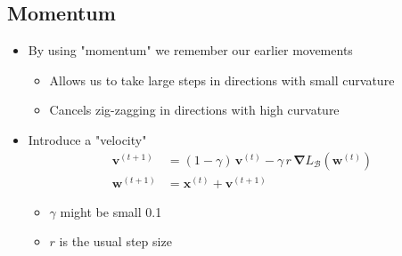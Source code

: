 \documentclass[11pt]{article}
\newcommand{\grad}{\bm{\nabla}}
\begin{document}
\subsection{Momentum}
\label{sec:org05b88b7}
\begin{itemize}
\item By using "momentum" we remember our earlier movements
\begin{itemize}
\item Allows us to take large steps in directions with small curvature
\item Cancels zig-zagging in directions with high curvature
\end{itemize}
\item Introduce a "velocity"
\begin{align*}
 \bm{v}^{(t+1)} &= (1-\gamma)\, \bm{v}^{(t)} - \gamma\,r\,\grad L_{\mathcal{B}}(\bm{w}^{(t)}) \\
 \bm{w}^{(t+1)} &= \bm{x}^{(t)}  + \bm{v}^{(t+1)}
\end{align*}
\begin{itemize}
\item \(\gamma\) might be small 0.1
\item \(r\) is the usual step size
\end{itemize}
\end{itemize}
\end{document}
